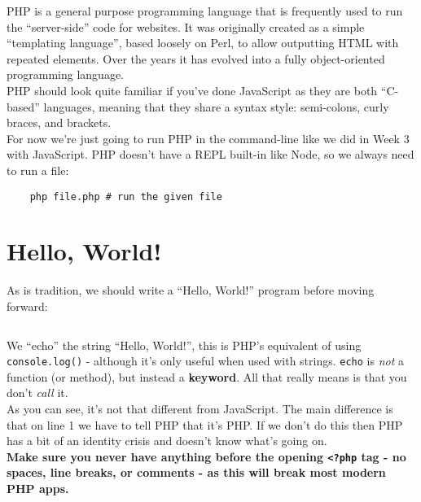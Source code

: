PHP is a general purpose programming language that is frequently used to run the ``server-side'' code for websites. It was originally created as a simple ``templating language'', based loosely on Perl, to allow outputting HTML with repeated elements. Over the years it has evolved into a fully object-oriented programming language.
\\

PHP should look quite familiar if you've done JavaScript as they are both ``C-based'' languages, meaning that they share a syntax style: semi-colons, curly braces, and brackets.
\\

For now we're just going to run PHP in the command-line like we did in Week 3 with JavaScript. PHP doesn't have a REPL built-in like Node, so we always need to run a file:

\begin{verbatim}
    php file.php # run the given file
\end{verbatim}


\section{Hello, World!}

As is tradition, we should write a ``Hello, World!'' program before moving forward:

\inputminted{php}{01/figures/01/01-hello.php}

We ``echo'' the string ``Hello, World!'', this is PHP's equivalent of using \texttt{console.log()} - although it's only useful when used with strings. \texttt{echo} is \textit{not} a function (or method), but instead a \textbf{keyword}. All that really means is that you don't \textit{call} it.
\\

As you can see, it's not that different from JavaScript. The main difference is that on line 1 we have to tell PHP that it's PHP. If we don't do this then PHP has a bit of an identity crisis and doesn't know what's going on.
\\

\textbf{Make sure you never have anything before the opening \texttt{<?php} tag - no spaces, line breaks, or comments - as this will break most modern PHP apps.}


